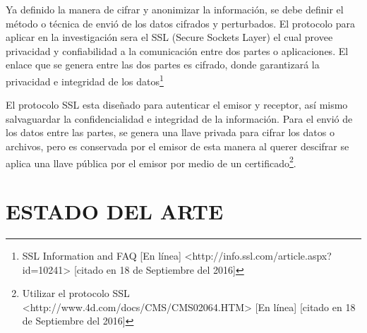 \documentclass[a4paper,openright,12pt]{book}
\theoremstyle{definition}
\theoremstyle{remark}
\begin{document}
Ya definido la manera de cifrar y anonimizar la información, se debe definir el método o técnica de envió de los datos cifrados y perturbados. El protocolo para aplicar en la investigación sera el SSL (Secure Sockets Layer)  el cual provee privacidad y confiabilidad a la comunicación entre dos partes o aplicaciones. El enlace que se genera entre las dos partes es cifrado, donde garantizará la privacidad e integridad de los datos\footnote{ SSL Information and FAQ [En línea] <http://info.ssl.com/article.aspx?id=10241> [citado en 18 de Septiembre del 2016]}

El protocolo SSL esta diseñado para autenticar el emisor y receptor, así mismo salvaguardar la confidencialidad e integridad de la información. Para el envió de los datos entre las partes, se genera una llave privada para cifrar los datos o archivos, pero es conservada por el emisor de esta manera al querer descifrar se aplica una llave pública por el emisor por medio de un certificado\footnote{Utilizar el protocolo SSL <http://www.4d.com/docs/CMS/CMS02064.HTM> [En línea] [citado en 18 de Septiembre del 2016]}.


\section{ESTADO DEL ARTE}
\end{document}
